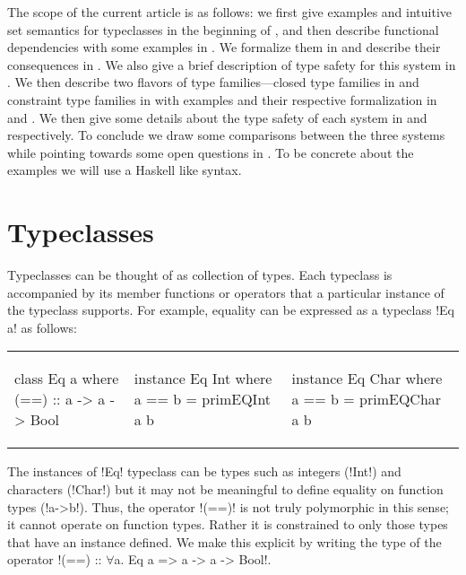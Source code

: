 \documentclass[format=acmsmall,manuscript,review,screen,nonacm,margin=1in,11pt]{acmart}
\begin{document}
The scope of the current article is as follows:
we first give examples and intuitive set semantics for typeclasses in the beginning of ,
and then describe functional dependencies\cite{jones_tcfd_2000} with some examples in .
We formalize them in  and describe their consequences %
in .
We also give a brief description of type safety for this system in .
We then describe two flavors of type families---closed type families\cite{eisenberg_typefamilies_2014}
in  and  constraint type families\cite{morris_typefamilies_2017}
in  with examples and their respective formalization in 
and . We then give some details about the type safety of
each system in  and  respectively.
To conclude we %
draw some comparisons between the three systems while pointing towards some open questions in .
To be concrete about the examples we will use a Haskell like syntax.

\section{Typeclasses}\label{sec:tc}
Typeclasses can be thought of as collection of types. Each typeclass is accompanied by its member
functions or operators that a particular instance of the typeclass supports. For example,
equality can be expressed as a typeclass !Eq a! as follows:\newline
{\footnotesize
\begin{tabular}{l l l}
\begin{code}
class Eq a where
  (==) :: a -> a -> Bool
\end{code}&%
\begin{code}
instance Eq Int where
  a == b = primEQInt a b
\end{code}&%
\begin{code}
instance Eq Char where
  a == b = primEQChar a b
\end{code}
\end{tabular} }\newline
The instances of !Eq! typeclass can be types such as integers (!Int!) and characters (!Char!) but
it may not be meaningful to define equality on function types (!a->b!). Thus, the operator
!(==)! is not truly polymorphic in this sense; it cannot operate on function types. Rather
it is constrained to only those types that have an instance defined. We make this explicit by writing
the type of the operator !(==) :: $\forall$a. Eq a => a -> a -> Bool!. 
\end{document}
